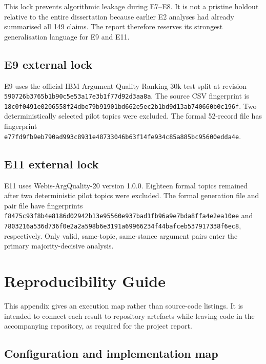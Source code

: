 \documentclass[11pt,twoside,a4paper]{report}
\begin{document}
This lock prevents algorithmic leakage during E7--E8.  It is not a pristine
holdout relative to the entire dissertation because earlier E2 analyses had
already summarised all 149 claims.  The report therefore reserves its strongest
generalisation language for E9 and E11.

\section{E9 external lock}

E9 uses the official IBM Argument Quality Ranking 30k test split at revision
\texttt{590726b3765b1b90c5e53a17e3b1f77d92d3aa8a}.  The source CSV fingerprint
is \texttt{18c0f0491e0206558f24dbe79b91901bd662e5ec2b1bd9d13ab740660b0c196f}.
Two deterministically selected pilot topics were excluded.  The formal 52-record
file has fingerprint
\texttt{e77fd9fb9eb790ad993c8931e48733046b63f14fe934c85a885bc95600edda4e}.

\section{E11 external lock}

E11 uses Webis-ArgQuality-20 version 1.0.0.  Eighteen formal topics remained
after two deterministic pilot topics were excluded.  The formal generation
file and pair file have fingerprints
\texttt{f8475c93f8b4e8186d02942b13e95560e937bad1fb96a9e7bda8ffa4e2ea10ee}
and
\texttt{7803216a536d736f0e2a2a598b6e3191a69966234f44bafceb537917338f6ec8},
respectively.  Only valid, same-topic, same-stance argument pairs enter the
primary majority-decisive analysis.


\chapter{Reproducibility Guide}
\label{app:reproducibility}

This appendix gives an execution map rather than source-code listings.  It is
intended to connect each result to repository artefacts while leaving code in
the accompanying repository, as required for the project report.

\section{Configuration and implementation map}
\end{document}
